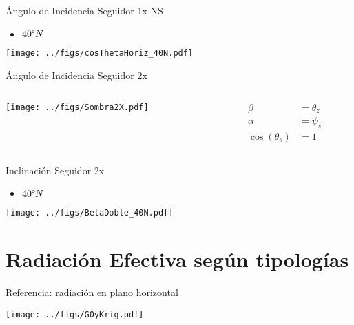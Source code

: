 \documentclass[aspectratio=169, usenames,svgnames,dvipsnames]{beamer}
\begin{document}
\begin{frame}[label={sec:org7f95e5e}]{Ángulo de Incidencia Seguidor 1x NS}
\begin{itemize}
\item \(40\degree N\)
\end{itemize}
\begin{center}
\texttt{[image: ../figs/cosThetaHoriz\_40N.pdf]}
\end{center}
\end{frame}




\begin{frame}[label={sec:org3a6a3ee},plain]{Ángulo de Incidencia Seguidor 2x}
\begin{columns}
\begin{column}{0.8\columnwidth}
\begin{center}
\texttt{[image: ../figs/Sombra2X.pdf]}
\end{center}
\end{column}

\begin{column}{0.2\columnwidth}
\begin{align*}
  \beta &= \theta_{z}\\
  \alpha &= \psi_{s}\\
  \cos(\theta_{s}) &= 1
\end{align*}
\end{column}
\end{columns}
\end{frame}
\begin{frame}[label={sec:orgfe82437}]{Inclinación Seguidor 2x}
\begin{itemize}
\item \(40\degree N\)
\end{itemize}
\begin{center}
\texttt{[image: ../figs/BetaDoble\_40N.pdf]}
\end{center}
\end{frame}


\section{Radiación Efectiva según tipologías}
\label{sec:orgc4b8919}

\begin{frame}[label={sec:org7566347}]{Referencia: radiación en plano horizontal}
\begin{center}
\texttt{[image: ../figs/G0yKrig.pdf]}
\end{center}
\end{frame}
\end{document}
